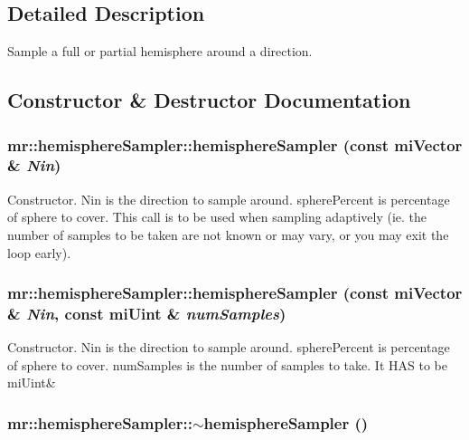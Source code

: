 \subsection{Detailed Description}
Sample a full or partial hemisphere around a direction. 



\subsection{Constructor \& Destructor Documentation}
\subsubsection{\setlength{\rightskip}{0pt plus 5cm}mr::hemisphere\-Sampler::hemisphere\-Sampler (const mi\-Vector \& {\em Nin})\hspace{0.3cm}{\tt  [inline]}}\label{classmr_1_1hemisphereSampler_a0}


Constructor. Nin is the direction to sample around. sphere\-Percent is percentage of sphere to cover. This call is to be used when sampling adaptively (ie. the number of samples to be taken are not known or may vary, or you may exit the loop early). 
\subsubsection{\setlength{\rightskip}{0pt plus 5cm}mr::hemisphere\-Sampler::hemisphere\-Sampler (const mi\-Vector \& {\em Nin}, const mi\-Uint \& {\em num\-Samples})\hspace{0.3cm}{\tt  [inline]}}\label{classmr_1_1hemisphereSampler_a1}


Constructor. Nin is the direction to sample around. sphere\-Percent is percentage of sphere to cover. num\-Samples is the number of samples to take. It HAS to be mi\-Uint\& 
\subsubsection{\setlength{\rightskip}{0pt plus 5cm}mr::hemisphere\-Sampler::$\sim${\bf hemisphere\-Sampler} ()\hspace{0.3cm}{\tt  [inline]}}\label{classmr_1_1hemisphereSampler_a2}




